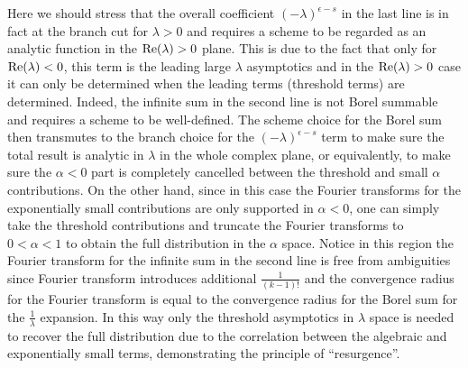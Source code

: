 \documentclass[a4paper,11pt]{article}
\begin{document}
Here we should stress that the overall coefficient $(-\lambda)^{\epsilon-s}$ in the last line is in fact at the branch cut for $\lambda>0$ and requires a scheme to be regarded as an analytic function in the ${\rm Re}(\lambda)>0$ plane. This is due to the fact that only for ${\rm Re}(\lambda)<0$, this term is the leading large $\lambda$ asymptotics and in the ${\rm Re}(\lambda)>0$ case it can only be determined when the leading terms (threshold terms) are determined. Indeed, the infinite sum in the second line is not Borel summable and requires a scheme to be well-defined. The scheme choice for the Borel sum then transmutes to the branch choice for the $(-\lambda)^{\epsilon-s}$ term to make sure the total result is analytic in $\lambda$ in the whole complex plane, or equivalently, to make sure the $\alpha<0$ part is completely cancelled between the threshold and small $\alpha$ contributions. On the other hand, since in this case the Fourier transforms for the exponentially small contributions are only supported in $\alpha<0$, one can simply take the threshold contributions and truncate the Fourier transforms to $0<\alpha<1$ to obtain the full distribution in the $\alpha$ space. Notice in this region the Fourier transform for the infinite sum in the second line is free from ambiguities since Fourier transform introduces additional $\frac{1}{(k-1)!}$ and the convergence radius for the Fourier transform is equal to the convergence radius for the Borel sum for the $\frac{1}{\lambda}$ expansion. In this way only the threshold asymptotics in $\lambda$ space is needed to recover the full distribution due to the correlation between the algebraic and exponentially small terms, demonstrating the principle of ``resurgence''. 
\end{document}
